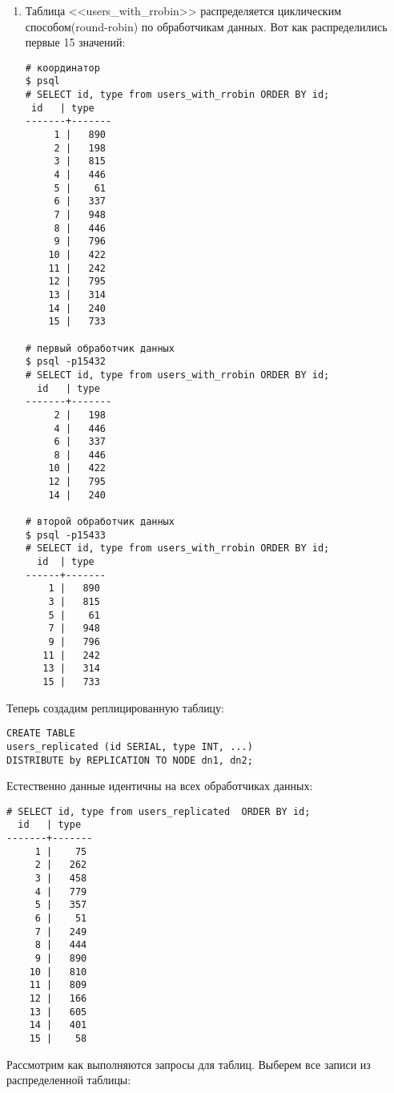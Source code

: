\begin{enumerate}
\item Таблица <<users\_with\_rrobin>> распределяется циклическим способом(round-robin) по обработчикам данных. Вот как распределились первые 15 значений:

\begin{lstlisting}[label=lst:postgres-xc5,caption=Данные с координатора и обработчиков данных]
# координатор
$ psql
# SELECT id, type from users_with_rrobin ORDER BY id;
 id   | type
-------+-------
     1 |   890
     2 |   198
     3 |   815
     4 |   446
     5 |    61
     6 |   337
     7 |   948
     8 |   446
     9 |   796
    10 |   422
    11 |   242
    12 |   795
    13 |   314
    14 |   240
    15 |   733

# первый обработчик данных
$ psql -p15432
# SELECT id, type from users_with_rrobin ORDER BY id;
  id   | type
-------+-------
     2 |   198
     4 |   446
     6 |   337
     8 |   446
    10 |   422
    12 |   795
    14 |   240

# второй обработчик данных
$ psql -p15433
# SELECT id, type from users_with_rrobin ORDER BY id;
  id  | type
------+-------
    1 |   890
    3 |   815
    5 |    61
    7 |   948
    9 |   796
   11 |   242
   13 |   314
   15 |   733
\end{lstlisting}

\end{enumerate}

Теперь создадим реплицированную таблицу:

\begin{lstlisting}[label=lst:postgres-xc20,caption=Создание реплицированной таблицы]
CREATE TABLE
users_replicated (id SERIAL, type INT, ...)
DISTRIBUTE by REPLICATION TO NODE dn1, dn2;
\end{lstlisting}

Естественно данные идентичны на всех обработчиках данных:

\begin{lstlisting}[label=lst:postgres-xc21,caption=Данные с координатора и обработчиков данных]
# SELECT id, type from users_replicated  ORDER BY id;
  id   | type
-------+-------
     1 |    75
     2 |   262
     3 |   458
     4 |   779
     5 |   357
     6 |    51
     7 |   249
     8 |   444
     9 |   890
    10 |   810
    11 |   809
    12 |   166
    13 |   605
    14 |   401
    15 |    58
\end{lstlisting}

Рассмотрим как выполняются запросы для таблиц. Выберем все записи из распределенной таблицы:

